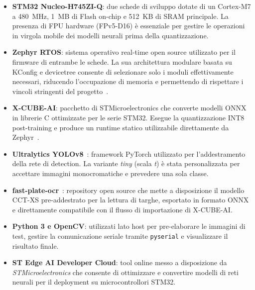 \begin{itemize}
    \item \textbf{STM32 Nucleo-H745ZI-Q}: due schede di sviluppo dotate di un Cortex-M7 a 480~MHz, 1~MB di Flash on-chip e 512~KB di SRAM principale. La presenza di FPU hardware (FPv5-D16) è essenziale per gestire le operazioni in virgola mobile dei modelli neurali prima della quantizzazione.
    \item \textbf{Zephyr RTOS}: sistema operativo real-time open source utilizzato per il firmware di entrambe le schede. La sua architettura modulare basata su KConfig e devicetree consente di selezionare solo i moduli effettivamente necessari, riducendo l'occupazione di memoria e permettendo di rispettare i vincoli stringenti del progetto~\cite{zephyr_doc}.
    \item \textbf{X-CUBE-AI}: pacchetto di STMicroelectronics che converte modelli ONNX in librerie C ottimizzate per le serie STM32. Esegue la quantizzazione INT8 post-training e produce un runtime statico utilizzabile direttamente da Zephyr~\cite{stm32cubeai_doc}.
    \item \textbf{Ultralytics YOLOv8}~\cite{jocher_2023_yolov8}: framework PyTorch utilizzato per l'addestramento della rete di detection. La variante \textit{tiny} (scala \textit{t}) è stata personalizzata per accettare immagini monocromatiche e prevedere una sola classe.
    \item \textbf{fast-plate-ocr}~\cite{ankandrew_2024_fastplateocr}: repository open source che mette a disposizione il modello CCT-XS pre-addestrato per la lettura di targhe, esportato in formato ONNX e direttamente compatibile con il flusso di importazione di X-CUBE-AI.
    \item \textbf{Python 3 e OpenCV}: utilizzati lato host per pre-elaborare le immagini di test, gestire la comunicazione seriale tramite \texttt{pyserial} e visualizzare il risultato finale.
    \item \textbf{ST Edge AI Developer Cloud}: tool online messo a disposizione da \textit{STMicroelectronics} che consente di ottimizzare e convertire modelli di reti neurali per il deployment su microcontrollori STM32.
\end{itemize}

